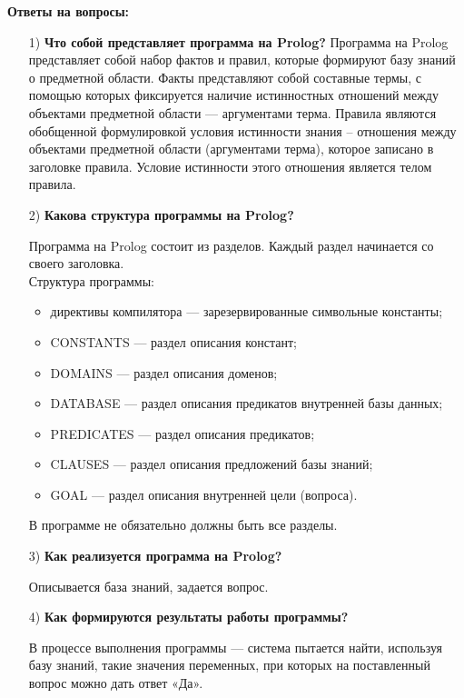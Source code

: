 \documentclass[12pt, a4paper]{extarticle}
\begin{document}
\newpage
\textbf{Ответы на вопросы:}
\begin{itemize}
	\item[1)] \textbf{Что собой представляет программа на Prolog?}
	Программа на Prolog представляет собой набор фактов и правил, которые
	формируют базу знаний о предметной области.
	Факты представляют собой составные термы, с помощью которых фиксируется
	наличие истинностных отношений между объектами предметной области —
	аргументами терма.
	Правила являются обобщенной формулировкой условия истинности знания –
	отношения между объектами предметной области (аргументами терма), которое
	записано в заголовке правила. Условие истинности этого отношения является
	телом правила.
	
	\item[2)] \textbf{Какова структура программы на Prolog?}\par
	Программа на Prolog состоит из разделов. Каждый раздел начинается со своего
	заголовка.\\
	Структура программы:\par
	\begin{itemize}
		\item директивы компилятора — зарезервированные символьные константы;
		\item CONSTANTS — раздел описания констант;
		\item DOMAINS — раздел описания доменов;
		\item DATABASE — раздел описания предикатов внутренней базы данных;
		\item PREDICATES — раздел описания предикатов;
		\item CLAUSES — раздел описания предложений базы знаний;
		\item GOAL — раздел описания внутренней цели (вопроса).
	\end{itemize}
	В программе не обязательно должны быть все разделы.
	
	\item[3)]  \textbf{Как реализуется программа на Prolog?}\par
	Описывается база знаний, задается вопрос.
	
	\item[4)] \textbf{Как формируются результаты работы программы?}\par
	В процессе выполнения программы — система пытается найти, используя базу
	знаний, такие значения переменных, при которых на поставленный вопрос
	можно дать ответ «Да».
\end{itemize}
\end{document}
